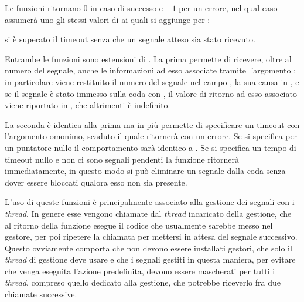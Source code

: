 \begin{funcproto}{
}

{Le funzioni ritornano $0$ in caso di successo e $-1$ per un errore, nel qual
  caso  assumerà uno gli stessi valori di  ai quali
  si aggiunge per :
  \begin{errlist}
  \item[\errcode{EAGAIN}] si è superato il timeout senza che un segnale atteso
    sia stato ricevuto.
  \end{errlist}
}
\end{funcproto}


Entrambe le funzioni sono estensioni di . La prima permette di
ricevere, oltre al numero del segnale, anche le informazioni ad esso associate
tramite l'argomento ; in particolare viene restituito il numero
del segnale nel campo , la sua causa in , e se il
segnale è stato immesso sulla coda con , il valore di ritorno
ad esso associato viene riportato in , che altrimenti è
indefinito.

La seconda è identica alla prima ma in più permette di specificare un timeout
con l'argomento omonimo, scaduto il quale ritornerà con un errore. Se si
specifica per  un puntatore nullo il comportamento sarà
identico a . Se si specifica un tempo di timeout nullo e non
ci sono segnali pendenti la funzione ritornerà immediatamente, in questo modo
si può eliminare un segnale dalla coda senza dover essere bloccati qualora
esso non sia presente.

L'uso di queste funzioni è principalmente associato alla gestione dei segnali
con i \textit{thread}. In genere esse vengono chiamate dal \textit{thread}
incaricato della gestione, che al ritorno della funzione esegue il codice che
usualmente sarebbe messo nel gestore, per poi ripetere la chiamata per
mettersi in attesa del segnale successivo. Questo ovviamente comporta che non
devono essere installati gestori, che solo il \textit{thread} di gestione deve
usare  e che i segnali gestiti in questa maniera, per evitare
che venga eseguita l'azione predefinita, devono essere mascherati per tutti i
\textit{thread}, compreso quello dedicato alla gestione, che potrebbe
riceverlo fra due chiamate successive.


